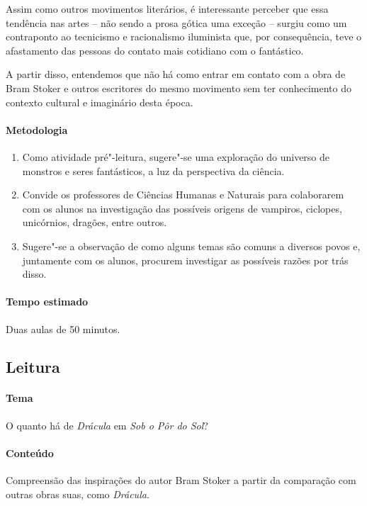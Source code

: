 \documentclass[12pt]{extarticle}
\begin{document}
Assim como outros movimentos literários, é interessante perceber que essa tendência nas artes -- não 
sendo a prosa gótica uma exceção -- surgiu como um contraponto ao tecnicismo e racionalismo iluminista 
que, por consequência, teve o afastamento das pessoas do contato mais cotidiano com o fantástico. 

A partir disso, entendemos que não há como entrar em contato com a obra de Bram Stoker e outros escritores 
do mesmo movimento sem ter conhecimento do contexto cultural e imaginário desta época.

\paragraph{Metodologia}

\begin{enumerate}
\item
Como atividade pré"-leitura, sugere"-se uma exploração do universo de
monstros e seres fantásticos, a luz da perspectiva da ciência. 

\item
Convide os professores de Ciências Humanas e Naturais para colaborarem com os
alunos na investigação das possíveis origens de vampiros, ciclopes,
unicórnios, dragões, entre outros. 

\item
Sugere"-se a observação de como alguns
temas são comuns a diversos povos e, juntamente com os alunos, procurem
investigar as possíveis razões por trás disso.

\end{enumerate}

\paragraph{Tempo estimado} Duas aulas de 50 minutos.

\subsection{Leitura} 

\paragraph{Tema} O quanto há de \emph{Drácula} em \emph{Sob o Pôr do Sol}?

\paragraph{Conteúdo} Compreensão das inspirações do autor Bram Stoker a partir
da comparação com outras obras suas, como \emph{Drácula}.
\end{document}
